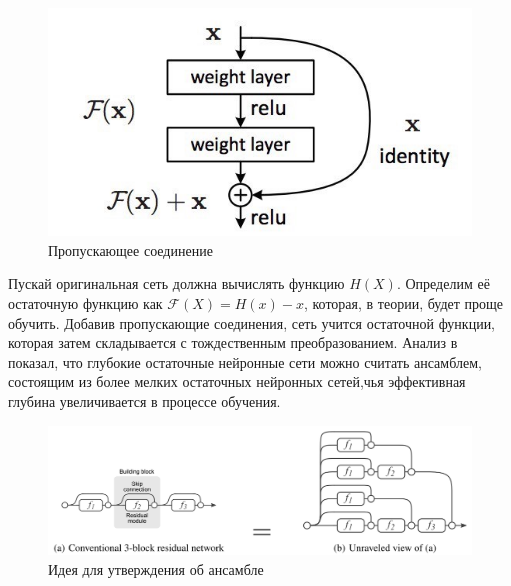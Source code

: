 \begin{figure}
	\centering
	\includegraphics[width=0.7\linewidth]{img/resnet}
	\caption{Пропускающее соединение}
	\label{fig:resnet}
\end{figure}

Пускай оригинальная сеть должна вычислять функцию
$ H(X) $. Определим её остаточную функцию как $ \mathcal{F}(X) = H(x) − x $,
которая, в теории, будет проще обучить. Добавив пропускающие
соединения, сеть учится остаточной функции, которая затем
складывается с тождественным преобразованием. Анализ\cite{veit2016residual} в показал, что глубокие остаточные нейронные сети можно считать ансамблем, состоящим из
более мелких остаточных нейронных сетей,чья эффективная глубина увеличивается в
процессе обучения.

\begin{figure}[h]
	\centering
	\includegraphics[width=0.7\linewidth]{img/resnet2}
	\caption{Идея для утверждения об ансамбле}
	\label{fig:resnet2}
\end{figure}

